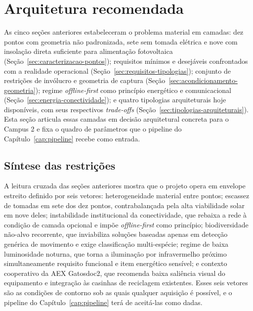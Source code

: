 \section{Arquitetura recomendada}
\label{sec:decisao-arquitetural}

As cinco seções anteriores estabeleceram o problema material em camadas: dez pontos com geometria não padronizada, sete sem tomada elétrica e nove com insolação direta suficiente para alimentação fotovoltaica (Seção~\ref{sec:caracterizacao-pontos}); requisitos mínimos e desejáveis confrontados com a realidade operacional (Seção~\ref{sec:requisitos-tipologias}); conjunto de restrições de invólucro e geometria de captura (Seção~\ref{sec:acondicionamento-geometria}); regime \emph{offline-first} como princípio energético e comunicacional (Seção~\ref{sec:energia-conectividade}); e quatro tipologias arquiteturais hoje disponíveis, com seus respectivos \emph{trade-offs} (Seção~\ref{sec:tipologias-arquiteturais}). Esta seção articula essas camadas em decisão arquitetural concreta para o Campus 2 e fixa o quadro de parâmetros que o pipeline do Capítulo~\ref{cap:pipeline} recebe como entrada.

\subsection*{Síntese das restrições}

A leitura cruzada das seções anteriores mostra que o projeto opera em envelope estreito definido por seis vetores: heterogeneidade material entre pontos; escassez de tomadas em sete dos dez pontos, contrabalançada pela alta viabilidade solar em nove deles; instabilidade institucional da conectividade, que rebaixa a rede à condição de camada opcional e impõe \emph{offline-first} como princípio; biodiversidade não-alvo recorrente, que inviabiliza soluções baseadas apenas em detecção genérica de movimento e exige classificação multi-espécie; regime de baixa luminosidade noturna, que torna a iluminação por infravermelho próximo simultaneamente requisito funcional e item energético sensível; e contexto cooperativo da AEX Gatosdoc2, que recomenda baixa saliência visual do equipamento e integração às casinhas de reciclagem existentes. Esses seis vetores são as condições de contorno sob as quais qualquer aquisição é possível, e o pipeline do Capítulo~\ref{cap:pipeline} terá de aceitá-las como dadas.

